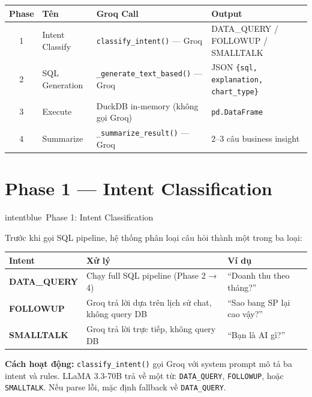 \documentclass[12pt, a4paper]{article}
\begin{document}
\begin{tcolorbox}[colback=gray!5, colframe=groqgreen!50, arc=6pt,
  title={\faSitemap\ Sơ đồ — Groq Agentic BI: Text-based SQL Pipeline}]
\begin{center}
\small
\begin{tabular}{clll}
\toprule
Phase & Tên & Groq Call & Output \\
\midrule
1 & Intent Classify  & \texttt{classify\_intent()} — Groq     & DATA\_QUERY / FOLLOWUP / SMALLTALK \\
2 & SQL Generation   & \texttt{\_generate\_text\_based()} — Groq   & JSON \texttt{\{sql, explanation, chart\_type\}} \\
3 & Execute          & DuckDB in-memory (không gọi Groq)   & \texttt{pd.DataFrame} \\
4 & Summarize        & \texttt{\_summarize\_result()} — Groq       & 2--3 câu business insight \\
\bottomrule
\end{tabular}
\end{center}

\end{tcolorbox}

\newpage

\section{Phase 1 — Intent Classification}

\begin{phasebox}{intentblue}{\faTag\ Phase 1: Intent Classification}

Trước khi gọi SQL pipeline, hệ thống phân loại câu hỏi thành một trong ba loại:

\vspace{0.5em}
\begin{tabularx}{\textwidth}{>{\bfseries\ttfamily}p{3.2cm} X p{2.5cm}}
\toprule
Intent & Xử lý & Ví dụ \\
\midrule
DATA\_QUERY    & Chạy full SQL pipeline (Phase 2 → 4) &
  ``Doanh thu theo tháng?'' \\
FOLLOWUP       & Groq trả lời dựa trên lịch sử chat, không query DB &
  ``Sao bang SP lại cao vậy?'' \\
SMALLTALK      & Groq trả lời trực tiếp, không query DB &
  ``Bạn là AI gì?'' \\
\bottomrule
\end{tabularx}

\vspace{0.8em}

\textbf{Cách hoạt động:} \texttt{classify\_intent()} gọi Groq với system prompt
mô tả ba intent và rules. LLaMA 3.3-70B trả về một từ:
\texttt{DATA\_QUERY}, \texttt{FOLLOWUP}, hoặc \texttt{SMALLTALK}.
Nếu parse lỗi, mặc định fallback về \texttt{DATA\_QUERY}.

\end{phasebox}
\end{document}
